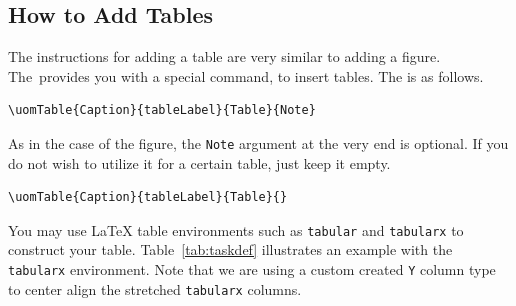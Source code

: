 \documentclass[12pt]{uomthesis}
\begin{document}
\subsection{How to Add Tables}
\label{sec:Latex:table}

The instructions for adding a table are very similar to adding a figure. The~\TheClass provides you with a special command,  to insert tables. The  is as follows.

\begin{indentedQuote}
\begin{verbatim}
\uomTable{Caption}{tableLabel}{Table}{Note}
\end{verbatim}
\end{indentedQuote}

As in the case of the figure, the \texttt{Note} argument at the very end is optional. If you do not wish to utilize it for a certain table, just keep it empty. 

\begin{indentedQuote}
\begin{verbatim}
\uomTable{Caption}{tableLabel}{Table}{}
\end{verbatim}
\end{indentedQuote}

You may use \LaTeX{} table environments such as \texttt{tabular} and \texttt{tabularx} to construct your table. Table~\ref{tab:taskdef} illustrates an example with the \texttt{tabularx} environment. Note that we are using a custom created \texttt{Y} column type to center align the stretched \texttt{tabularx} columns.

\begin{table}[!htb]
\end{table}
\end{document}
